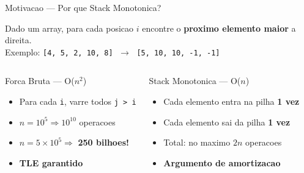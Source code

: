 \documentclass[aspectratio=169,11pt]{beamer}
\begin{document}
\begin{frame}{Motivacao --- Por que Stack Monotonica?}
  \begin{tcolorbox}[caixaAzul,title={Problema Central}]
    Dado um array, para cada posicao $i$ encontre o
    \textbf{proximo elemento maior} a direita.\\[4pt]
    Exemplo: \quad
    \texttt{[4,\ 5,\ 2,\ 10,\ 8]}
    $\;\longrightarrow\;$
    \texttt{[5,\ 10,\ 10,\ -1,\ -1]}
  \end{tcolorbox}
  \vspace{0.2cm}
  \begin{columns}[t]
      \begin{alertblock}{Forca Bruta --- O($n^2$)}
        \begin{itemize}\small
          \item Para cada \texttt{i}, varre todos \texttt{j > i}
          \item $n = 10^5 \Rightarrow 10^{10}$ operacoes
          \item $n = 5{\times}10^5 \Rightarrow$ \textbf{250 bilhoes!}
          \item \textbf{TLE garantido}
        \end{itemize}
      \end{alertblock}
      \begin{exampleblock}{Stack Monotonica --- O($n$)}
        \begin{itemize}\small
          \item Cada elemento entra na pilha \textbf{1 vez}
          \item Cada elemento sai da pilha \textbf{1 vez}
          \item Total: no maximo $2n$ operacoes
          \item \textbf{Argumento de amortizacao}
        \end{itemize}
      \end{exampleblock}
  \end{columns}
\end{frame}
\end{document}
